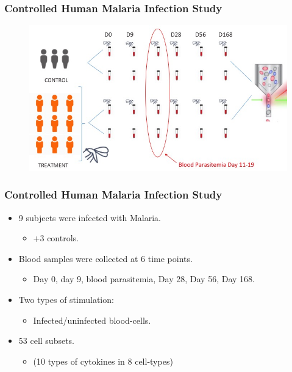 \documentclass{beamer}
\theoremstyle{definition}
\begin{document}


\begin{frame}
\frametitle{Controlled Human Malaria Infection Study}
\begin{figure}[]
\includegraphics[width=11 cm]{figures/malariaGraphic}
\end{figure}
\end{frame}


\begin{frame}
\frametitle{Controlled Human Malaria Infection Study}
\begin{itemize}
\item 9 subjects were infected with Malaria.
	\begin{itemize}
	\item +3 controls.
	\end{itemize}
	\vspace{0.75 cm}
	
\item Blood samples were collected at 6 time points.
	\begin{itemize}
	\item Day 0, day 9, blood  parasitemia, Day 28, Day 56, Day 168.
	\end{itemize}
	\vspace{0.75 cm}

\item Two types of stimulation:
	\begin{itemize}
	\item Infected/uninfected blood-cells.
	\end{itemize}
	\vspace{0.75 cm}
	
\item 53 cell subsets.
	\begin{itemize}
	\item (10 types of cytokines in 8 cell-types)
	\end{itemize} 
\end{itemize}
\end{frame}
\end{document}
